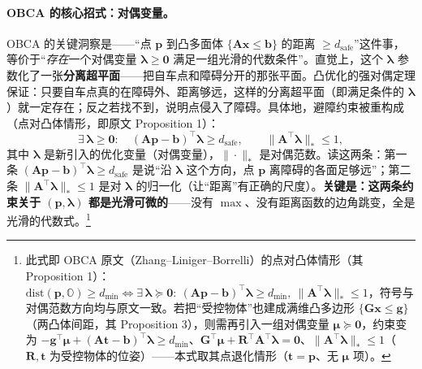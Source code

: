 \paragraph{OBCA 的核心招式：对偶变量。}
OBCA 的关键洞察是——“点 $\mathbf p$ 到凸多面体 $\{\mathbf A\mathbf x\le\mathbf b\}$ 的距离 $\ge d_{\text{safe}}$”这件事，等价于“\emph{存在}一个对偶变量 $\boldsymbol\lambda\ge\mathbf 0$ 满足一组光滑的代数条件”\cite{zhang2021obca}。直觉上，这个 $\boldsymbol\lambda$ 参数化了一张\textbf{分离超平面}——把自车点和障碍分开的那张平面。凸优化的强对偶定理保证：只要自车点真的在障碍外、距离够远，这样的分离超平面（即满足条件的 $\boldsymbol\lambda$）就一定存在；反之若找不到，说明点侵入了障碍。具体地，避障约束被重构成（点对凸体情形，即原文 Proposition 1）：
\begin{equation}
  \exists\,\boldsymbol\lambda\ge\mathbf 0:\quad
  (\mathbf A\mathbf p-\mathbf b)^\top\boldsymbol\lambda\ge d_{\text{safe}},\qquad
  \|\mathbf A^\top\boldsymbol\lambda\|_*\le 1,
  \label{eq:st-obca-dual}
\end{equation}
其中 $\boldsymbol\lambda$ 是新引入的优化变量（对偶变量），$\|\cdot\|_*$ 是对偶范数。读这两条：第一条 $(\mathbf A\mathbf p-\mathbf b)^\top\boldsymbol\lambda\ge d_{\text{safe}}$ 是说“沿 $\boldsymbol\lambda$ 这个方向，点 $\mathbf p$ 离障碍的各面足够远”；第二条 $\|\mathbf A^\top\boldsymbol\lambda\|_*\le 1$ 是对 $\boldsymbol\lambda$ 的归一化（让“距离”有正确的尺度）。\textbf{关键是：这两条约束关于 $(\mathbf p,\boldsymbol\lambda)$ 都是光滑可微的}——没有 $\max$、没有距离函数的边角跳变，全是光滑的代数式。\footnote{此式即 OBCA 原文（Zhang--Liniger--Borrelli）的点对凸体情形（其 Proposition 1）：$\mathrm{dist}(\mathbf p,\mathbb O)\ge d_{\min}\iff \exists\,\boldsymbol\lambda\succeq\mathbf 0:\ (\mathbf A\mathbf p-\mathbf b)^\top\boldsymbol\lambda\ge d_{\min},\ \|\mathbf A^\top\boldsymbol\lambda\|_*\le 1$，符号与对偶范数方向均与原文一致。若把“受控物体”也建成满维凸多边形 $\{\mathbf G\mathbf x\le\mathbf g\}$（两凸体间距，其 Proposition 3），则需再引入一组对偶变量 $\boldsymbol\mu\succeq\mathbf 0$，约束变为 $-\mathbf g^\top\boldsymbol\mu+(\mathbf A\mathbf t-\mathbf b)^\top\boldsymbol\lambda\ge d_{\min}$、$\mathbf G^\top\boldsymbol\mu+\mathbf R^\top\mathbf A^\top\boldsymbol\lambda=\mathbf 0$、$\|\mathbf A^\top\boldsymbol\lambda\|_*\le 1$（$\mathbf R,\mathbf t$ 为受控物体的位姿）——本式取其点退化情形（$\mathbf t=\mathbf p$、无 $\boldsymbol\mu$ 项）。}

